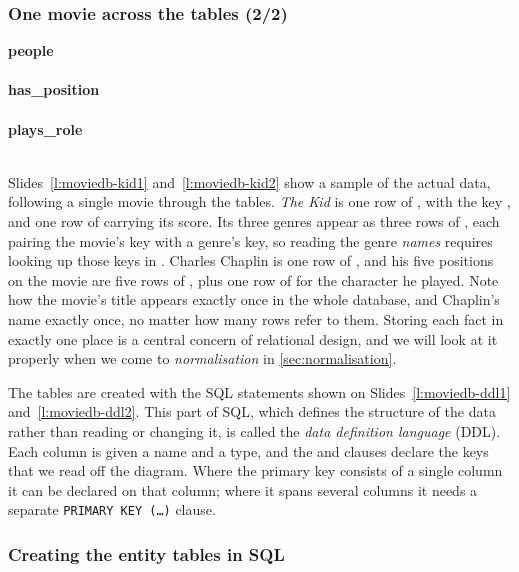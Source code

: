 \begin{frame}[label=moviedb-kid2]
    \label{s:moviedb-kid2}
    \frametitle{One movie across the tables (2/2)}
    {\footnotesize
    \textbf{people}\\[0.2em]
    \\[1em]
    \textbf{has\_position}\\[0.2em]
    \\[1em]
    \textbf{plays\_role}\\[0.2em]
    \\[1em]}
\end{frame}
\label{l:moviedb-kid2}

Slides~\ref{l:moviedb-kid1} and~\ref{l:moviedb-kid2} show a sample of the actual data, following a single movie through the tables.
\emph{The Kid} is one row of , with the key , and one row of  carrying its score.
Its three genres appear as three rows of , each pairing the movie's key with a genre's key, so reading the genre \emph{names} requires looking up those keys in .
Charles Chaplin is one row of , and his five positions on the movie are five rows of , plus one row of  for the character he played.
Note how the movie's title appears exactly once in the whole database, and Chaplin's name exactly once, no matter how many rows refer to them.
Storing each fact in exactly one place is a central concern of relational design, and we will look at it properly when we come to \emph{normalisation} in \autoref{sec:normalisation}.

The tables are created with the SQL  statements shown on Slides~\ref{l:moviedb-ddl1} and~\ref{l:moviedb-ddl2}.
This part of SQL, which defines the structure of the data rather than reading or changing it, is called the \emph{data definition language} (DDL).
Each column is given a name and a type, and the  and  clauses declare the keys that we read off the diagram.
Where the primary key consists of a single column it can be declared on that column; where it spans several columns it needs a separate \texttt{PRIMARY KEY (\dots)} clause.

\begin{frame}
    \label{s:moviedb-ddl1}
    \frametitle{Creating the entity tables in SQL}
    \inputminted[fontsize=\scriptsize]{sql}{code/movies-entities.sql}
\end{frame}
\label{l:moviedb-ddl1}

